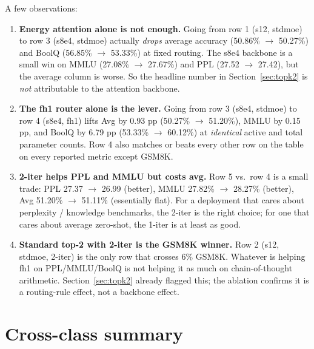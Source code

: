 \documentclass[oneside]{article}
\begin{document}
A few observations:
\begin{enumerate}[leftmargin=1.5em]
  \item \textbf{Energy attention alone is not enough.} Going from row 1 (s12, stdmoe) to row 3 (s8e4, stdmoe) actually \emph{drops} average accuracy (50.86\% $\to$ 50.27\%) and BoolQ (56.85\% $\to$ 53.33\%) at fixed routing. The s8e4 backbone is a small win on MMLU (27.08\% $\to$ 27.67\%) and PPL (27.52 $\to$ 27.42), but the average column is worse. So the headline number in Section~\ref{sec:topk2} is \emph{not} attributable to the attention backbone.
  \item \textbf{The fh1 router alone is the lever.} Going from row 3 (s8e4, stdmoe) to row 4 (s8e4, fh1) lifts Avg by 0.93 pp (50.27\% $\to$ 51.20\%), MMLU by 0.15 pp, and BoolQ by 6.79 pp (53.33\% $\to$ 60.12\%) at \emph{identical} active and total parameter counts. Row 4 also matches or beats every other row on the table on every reported metric except GSM8K.
  \item \textbf{2-iter helps PPL and MMLU but costs avg.} Row 5 vs.\ row 4 is a small trade: PPL 27.37 $\to$ 26.99 (better), MMLU 27.82\% $\to$ 28.27\% (better), Avg 51.20\% $\to$ 51.11\% (essentially flat). For a deployment that cares about perplexity / knowledge benchmarks, the 2-iter is the right choice; for one that cares about average zero-shot, the 1-iter is at least as good.
  \item \textbf{Standard top-2 with 2-iter is the GSM8K winner.} Row 2 (s12, stdmoe, 2-iter) is the only row that crosses 6\% GSM8K. Whatever is helping fh1 on PPL/MMLU/BoolQ is not helping it as much on chain-of-thought arithmetic. Section~\ref{sec:topk2} already flagged this; the ablation confirms it is a routing-rule effect, not a backbone effect.
\end{enumerate}


\section{Cross-class summary}
\label{sec:summary}
\end{document}

